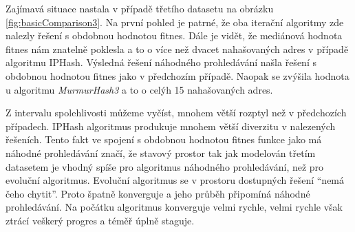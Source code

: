 Zajímavá situace nastala v případě třetího datasetu na obrázku \ref{fig:basicComparison3}.
Na první pohled je patrné,
že oba iterační algoritmy zde nalezly řešení s obdobnou hodnotou fitnes. Dále je vidět,
že mediánová hodnota fitnes nám znatelně poklesla a to o více než dvacet nahašovaných 
adres v případě algoritmu IPHash. Výsledná řešení náhodného prohledávání našla
řešení s obdobnou hodnotou fitnes jako v předchozím případě. Naopak se zvýšila 
hodnota u algoritmu \textit{MurmurHash3} a to o celýh 15 nahašovaných adres.

Z intervalu spolehlivosti můžeme vyčíst, mnohem větší rozptyl než v předchozích
případech. IPHash algoritmus produkuje mnohem větší diverzitu v nalezených řešeních.
Tento fakt ve spojení s obdobnou hodnotou fitnes funkce jako má náhodné prohledávání
značí, že stavový prostor tak jak modelován třetím datasetem je vhodný spíše pro 
algoritmus náhodného prohledávání, než pro evoluční algoritmus. Evoluční algoritmus
se v prostoru dostupných řešení ``nemá čeho chytit''. Proto špatně konverguje a jeho
průběh připomíná náhodné prohledávání. Na počátku algoritmus konverguje velmi rychle,
velmi rychle však ztrácí veškerý progres a téměř úplně staguje.

